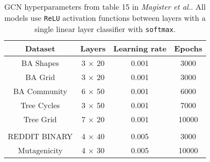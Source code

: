 \begin{table}
    \centering
    \begin{tabular}{c|ccc}
        \textbf{Dataset} &
        \textbf{Layers} &
        \textbf{Learning rate} &
        \textbf{Epochs} \\
        \midrule
        BA Shapes       & 3 $\times$ 20 & 0.001 & 3000 \\
        BA Grid         & 3 $\times$ 20 & 0.001 & 3000 \\
        BA Community    & 6 $\times$ 50 & 0.001 & 6000 \\
        Tree Cycles     & 3 $\times$ 50 & 0.001 & 7000 \\
        Tree Grid       & 7 $\times$ 20 & 0.001 & 10000 \\
        \midrule \\
        REDDIT BINARY   & 4 $\times$ 40 & 0.005 & 3000 \\
        Mutagenicity    & 4 $\times$ 30 & 0.005 & 10000 \\
    \end{tabular}
    \caption{GCN hyperparameters from table 15 in \textit{Magister et al.}\cite{magister2021gcexplainer}. All models use \texttt{ReLU} activation functions between layers with a single linear layer classifier with \texttt{softmax}.}
    \label{tab:GCN-params}
\end{table}

